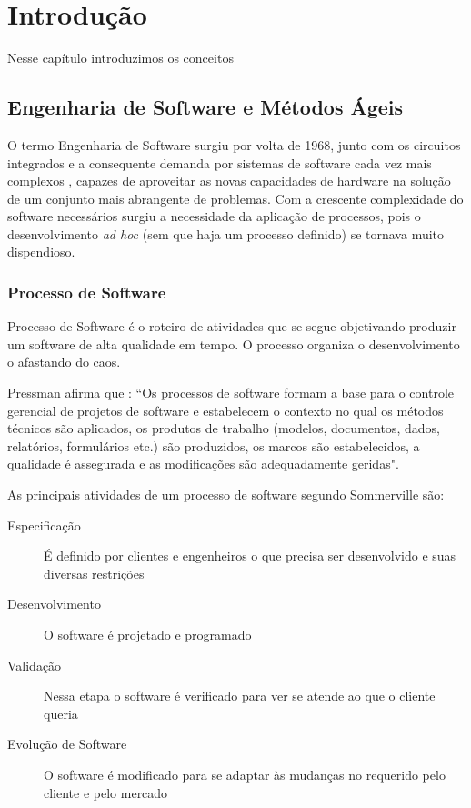 \chapter{Introdução}

Nesse capítulo introduzimos os conceitos 

\section{Engenharia de Software e Métodos Ágeis}


O termo Engenharia de Software surgiu por volta de 1968, junto com os circuitos integrados e a consequente demanda por  sistemas de software cada vez mais complexos \cite{Sommerville2007}, capazes de aproveitar as novas capacidades de hardware  na solução de um conjunto mais abrangente de problemas. Com a crescente complexidade do software necessários surgiu a necessidade da aplicação de processos, pois o desenvolvimento \emph{ad hoc} (sem que haja um processo definido) se tornava muito dispendioso.


\subsection{Processo de Software}
	Processo de Software é o roteiro de atividades que se segue objetivando produzir um software de alta qualidade em tempo. O processo organiza o desenvolvimento o afastando do caos. 
	
	Pressman \cite{Pressman2006} afirma que :
“Os processos de software formam a base para o controle gerencial de projetos de software e estabelecem o contexto no qual os métodos técnicos são aplicados, os produtos de trabalho (modelos, documentos, dados, relatórios, formulários etc.) são produzidos, os marcos são estabelecidos, a qualidade é assegurada e as modificações são adequadamente geridas". 
	
As principais atividades de um processo de software segundo Sommerville \cite{Sommerville2007} são: 
\begin{description}
\item[Especificação] É definido por clientes e engenheiros o que precisa ser desenvolvido e suas diversas restrições
\item[Desenvolvimento] O software é projetado e programado
\item[Validação] Nessa etapa o software é verificado para ver se atende ao que o cliente queria
\item[Evolução de Software] O software é modificado para se adaptar às mudanças  no requerido pelo cliente e pelo mercado
\end{description}

